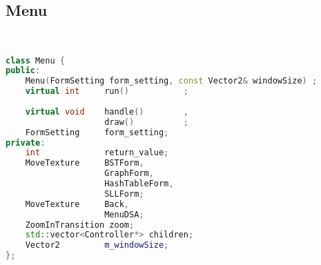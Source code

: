 \subsection{Menu}
\begin{lstlisting}[language=C++]


class Menu {
public:
    Menu(FormSetting form_setting, const Vector2& windowSize) ;
    virtual int     run()           ;
    
    virtual void    handle()        ,
                    draw()          ;
    FormSetting     form_setting;
private:
    int             return_value;
    MoveTexture     BSTForm,
                    GraphForm,
                    HashTableForm,
                    SLLForm;
    MoveTexture     Back,
                    MenuDSA;
    ZoomInTransition zoom;
    std::vector<Controller*> children;
    Vector2         m_windowSize;
};






\end{lstlisting}
